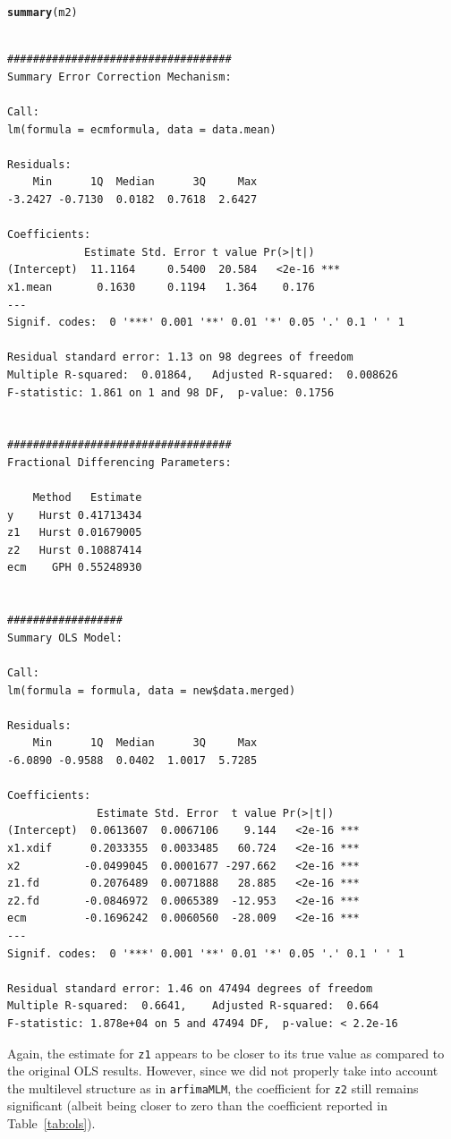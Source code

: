 \documentclass[12pt]{paper}\usepackage[]{graphicx}\usepackage[]{color}
\makeatletter
\newcommand{\hlstd}[1]{\textcolor[rgb]{0.345,0.345,0.345}{#1}}%
\newcommand{\hlkwd}[1]{\textcolor[rgb]{0.737,0.353,0.396}{\textbf{#1}}}%
\newenvironment{kframe}{%
 \def\at@end@of@kframe{}%
 \ifinner\ifhmode%
  \def\at@end@of@kframe{\end{minipage}}%
  \begin{minipage}{\columnwidth}%
 \fi\fi%
 \def\FrameCommand##1{\hskip\@totalleftmargin \hskip-\fboxsep
 \colorbox{shadecolor}{##1}\hskip-\fboxsep
     \hskip-\linewidth \hskip-\@totalleftmargin \hskip\columnwidth}%
 \MakeFramed {\advance\hsize-\width
   \@totalleftmargin\z@ \linewidth\hsize
   \@setminipage}}%
 {\par\unskip\endMakeFramed%
 \at@end@of@kframe}
\newenvironment{knitrout}{}{} %
\makeatother
\begin{document}
\begin{knitrout}
\color{fgcolor}\begin{kframe}
\begin{alltt}
\hlkwd{summary}\hlstd{(m2)}
\end{alltt}
\begin{verbatim}

###################################
Summary Error Correction Mechanism: 

Call:
lm(formula = ecmformula, data = data.mean)

Residuals:
    Min      1Q  Median      3Q     Max 
-3.2427 -0.7130  0.0182  0.7618  2.6427 

Coefficients:
            Estimate Std. Error t value Pr(>|t|)    
(Intercept)  11.1164     0.5400  20.584   <2e-16 ***
x1.mean       0.1630     0.1194   1.364    0.176    
---
Signif. codes:  0 '***' 0.001 '**' 0.01 '*' 0.05 '.' 0.1 ' ' 1

Residual standard error: 1.13 on 98 degrees of freedom
Multiple R-squared:  0.01864,	Adjusted R-squared:  0.008626 
F-statistic: 1.861 on 1 and 98 DF,  p-value: 0.1756


###################################
Fractional Differencing Parameters: 

    Method   Estimate
y    Hurst 0.41713434
z1   Hurst 0.01679005
z2   Hurst 0.10887414
ecm    GPH 0.55248930


##################
Summary OLS Model: 

Call:
lm(formula = formula, data = new$data.merged)

Residuals:
    Min      1Q  Median      3Q     Max 
-6.0890 -0.9588  0.0402  1.0017  5.7285 

Coefficients:
              Estimate Std. Error  t value Pr(>|t|)    
(Intercept)  0.0613607  0.0067106    9.144   <2e-16 ***
x1.xdif      0.2033355  0.0033485   60.724   <2e-16 ***
x2          -0.0499045  0.0001677 -297.662   <2e-16 ***
z1.fd        0.2076489  0.0071888   28.885   <2e-16 ***
z2.fd       -0.0846972  0.0065389  -12.953   <2e-16 ***
ecm         -0.1696242  0.0060560  -28.009   <2e-16 ***
---
Signif. codes:  0 '***' 0.001 '**' 0.01 '*' 0.05 '.' 0.1 ' ' 1

Residual standard error: 1.46 on 47494 degrees of freedom
Multiple R-squared:  0.6641,	Adjusted R-squared:  0.664 
F-statistic: 1.878e+04 on 5 and 47494 DF,  p-value: < 2.2e-16
\end{verbatim}
\end{kframe}
\end{knitrout}

Again, the estimate for \texttt{z1} appears to be closer to its true value as compared to the original OLS results. However, since we did not properly take into account the multilevel structure as in \texttt{arfimaMLM}, the coefficient for \texttt{z2} still remains significant (albeit being closer to zero than the coefficient reported in Table~\ref{tab:ols}).



\end{document}
